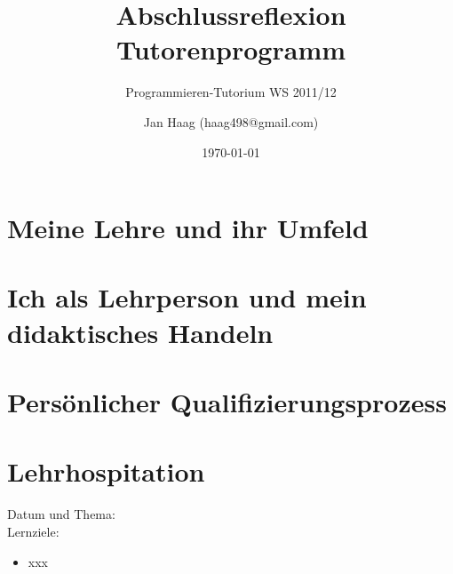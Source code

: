 \documentclass[%
fontsize=12pt,
paper=a4,
oneside,
DIV=11,
BCOR=0cm,
pagesize=automedia,
parskip=false,
headings=normal,
titlepage=true%
]{scrartcl}
\author{Jan Haag (haag498@gmail.com)}
\title{Abschlussreflexion Tutorenprogramm}
\subtitle{Programmieren-Tutorium WS 2011/12}
\date{\today}
\begin{document}
\maketitle
\section{Meine Lehre und ihr Umfeld}
\section{Ich als Lehrperson und mein didaktisches Handeln}
\section{Pers\"{o}nlicher Qualifizierungsprozess}
\section{Lehrhospitation}
\clearpage
Datum und Thema:\\
Lernziele:
\begin{itemize}
\item xxx
\end{itemize}
\end{document}

